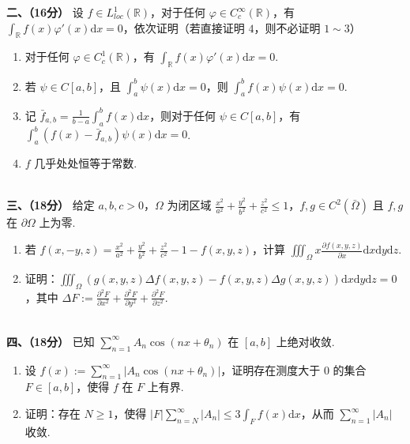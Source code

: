 \textbf{二、（16分）}
设 $f\in L_{loc}^1(\mathbb R)$，对于任何 $\varphi\in C_c^{\infty}(\mathbb R)$，有 $\displaystyle\int_{\mathbb R} f(x)\varphi'(x)\mathrm dx=0$，依次证明（若直接证明 $4$，则不必证明 $1\sim3$）
\begin{enumerate}
    \item 对于任何 $\varphi\in C_c^1(\mathbb R)$，有 $\displaystyle\int_{\mathbb R} f(x)\varphi'(x)\mathrm dx=0$.
    \item 若 $\psi\in C[a,b]$，且 $\displaystyle\int_a^b\psi(x)\mathrm dx=0$，则 $\displaystyle\int_a^b f(x)\psi(x)\mathrm dx=0$.
    \item 记 $\displaystyle\bar f_{a,b}=\frac1{b-a}\int_a^bf(x)\mathrm dx$，则对于任何 $\psi\in C[a,b]$，有 $\displaystyle\int_a^b (f(x)-\bar f_{a,b})\psi(x)\mathrm dx=0$.
    \item $f$ 几乎处处恒等于常数.
\end{enumerate}

\\

\textbf{三、（18分）}
给定 $a,b,c>0$，$\Omega$ 为闭区域 $\displaystyle\frac{x^2}{a^2}+\frac{y^2}{b^2}+\frac{z^2}{c^2}\leq1$，$f,g\in C^2(\bar\Omega)$ 且 $f,g$ 在 $\partial\Omega$ 上为零.
\begin{enumerate}
    \item 若 $\displaystyle f(x,-y,z)=\frac{x^2}{a^2}+\frac{y^2}{b^2}+\frac{z^2}{c^2}-1-f(x,y,z)$，计算 $\displaystyle\iiint_\Omega x\frac{\partial f(x,y,z)}{\partial x}\mathrm dx\mathrm dy\mathrm dz$.
    \item 证明：$\displaystyle\iiint_\Omega\left(g(x,y,z)\Delta f(x,y,z)-f(x,y,z)\Delta g(x,y,z)\right)\mathrm dx\mathrm dy\mathrm dz=0$，其中 $\displaystyle\Delta F:=\frac{\partial^2 F}{\partial x^2}+\frac{\partial^2 F}{\partial y^2}+\frac{\partial^2 F}{\partial z^2}$.
\end{enumerate}

\\

\textbf{四、（18分）}
已知 $\displaystyle\sum_{n=1}^\infty A_n\cos(nx+\theta_n)$ 在 $[a,b]$ 上绝对收敛.
\begin{enumerate}
    \item 设 $\displaystyle f(x):=\sum_{n=1}^\infty\left|A_n\cos(nx+\theta_n)\right|$，证明存在测度大于 $0$ 的集合 $F\in[a,b]$，使得 $f$ 在 $F$ 上有界.
    \item 证明：存在 $N\geq1$，使得 $\displaystyle|F|\sum_{n=N}^\infty|A_n|\leq3\int_F f(x)\mathrm dx$，从而 $\displaystyle\sum_{n=1}^\infty|A_n|$ 收敛.
\end{enumerate}

